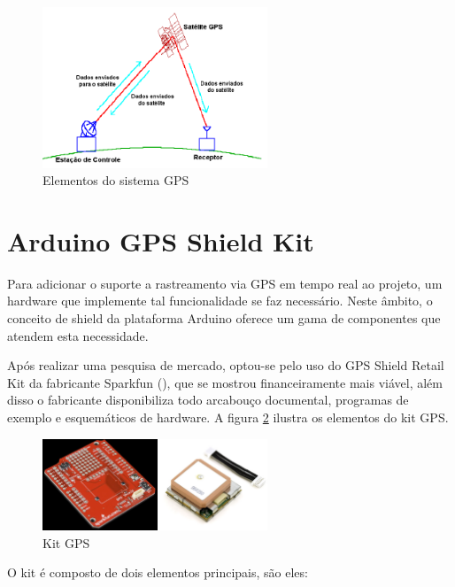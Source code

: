 \begin{figure}[h!]
			\centering
			\includegraphics[width=0.6\textwidth]{figures/elemGPS.png}
			\caption{Elementos do sistema GPS}
			\label{fig:elementosgps}
\end{figure}

\newpage
\section{Arduino GPS Shield Kit}

Para adicionar o suporte a rastreamento via GPS em tempo real ao projeto, um hardware que implemente tal funcionalidade se faz necessário. Neste âmbito, o conceito de shield da plataforma Arduino oferece um gama de componentes que atendem esta necessidade.

Após realizar uma pesquisa de mercado, optou-se pelo uso do GPS Shield Retail Kit da fabricante Sparkfun (\textcite{gpsshield:2013}), que se mostrou financeiramente mais viável, além disso o fabricante disponibiliza todo arcabouço documental, programas de exemplo e esquemáticos de hardware. A figura \ref{fig:kitgps} ilustra os elementos do kit GPS.

\begin{figure}[h!]
			\centering
			\includegraphics[width=0.6\textwidth]{figures/6_gps.png}
			\caption{Kit GPS}
			\label{fig:kitgps}
\end{figure}

O kit é composto de dois elementos principais, são eles:

